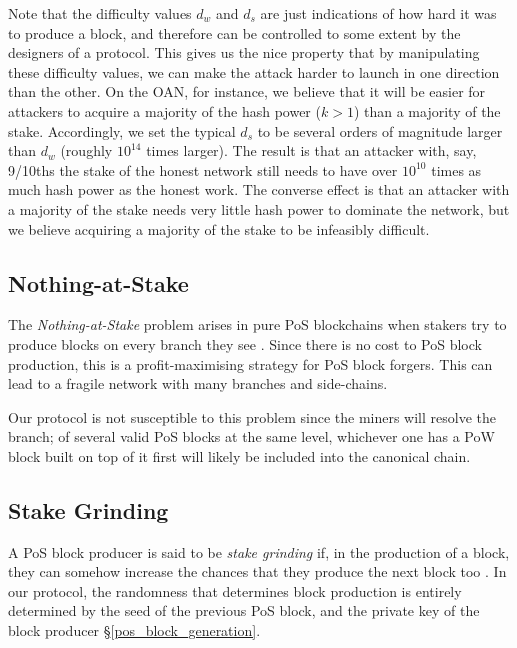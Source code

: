 Note that the difficulty values $d_w$ and $d_s$ are just indications of how hard it was to produce a block, and therefore can be controlled to some extent by the designers of a protocol. This gives us
the nice property that by manipulating these difficulty values, we can make the attack harder to launch in one direction than the other. On the OAN, for instance, we believe that it will be easier for attackers to acquire a majority of the hash power ($k > 1$) than a majority of the stake. Accordingly, we set the typical
$d_s$ to be several orders of magnitude larger than $d_w$ (roughly $10^{14}$ times larger). The result is that an attacker with, say, 9/10ths the stake of the honest network still needs to have over $10^{10}$ times as much hash power as the honest work. The converse effect is that an attacker with a majority of the stake needs very little hash power to dominate the network, but we believe acquiring a majority of the stake to be infeasibly difficult.

\subsection{Nothing-at-Stake}

The  \textit{Nothing-at-Stake} problem arises in pure PoS blockchains when stakers try to produce blocks on every branch they see \cite{brown2018formal}. Since there is no cost to PoS block production, this is a profit-maximising strategy for PoS block forgers. This can lead to a fragile network with many branches and side-chains. 

Our protocol is not susceptible to this problem since the miners will resolve the branch; of several valid PoS blocks at the same level, whichever one has a PoW block built on top of it first will likely be included into the canonical chain.

\subsection{Stake Grinding}

A PoS block producer is said to be \textit{stake grinding} if, in the production of a block, they can somehow increase the chances that they produce the next block too \cite{buterin_randomness}. In our protocol, the randomness that determines block production is entirely determined by the seed of the previous PoS block, and the private key of the block producer \S\ref{pos_block_generation}.

